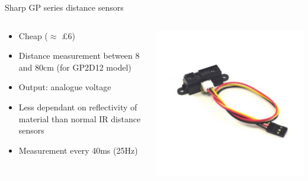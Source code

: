 \documentclass[compress]{beamer}
\begin{document}
\begin{frame}{Sharp GP series distance sensors}

    \begin{columns}
        \begin{column}{0.5\linewidth}

            \begin{itemize}

                \item Cheap ($\approx$ £6)
                \item Distance measurement between 8 and 80cm (for GP2D12 model)
                \item Output: analogue voltage
                \item Less dependant on reflectivity of material than normal IR distance
                    sensors
                \item Measurement every 40ms (25Hz)
            \end{itemize}

        \end{column}
        \begin{column}{0.5\linewidth}
            \begin{center}
                \includegraphics[width=0.9\linewidth]{sharp_ir}
            \end{center}
        \end{column}
    \end{columns}

\end{frame}
\end{document}
